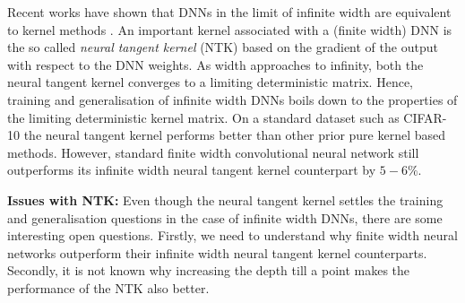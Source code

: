 \documentclass{article}
\begin{document}

Recent works have shown that DNNs in the limit of infinite width are equivalent to kernel methods \cite{ntk,fcgp,convgp,arora2019exact,cao2019generalization}. An important kernel associated with a (finite width) DNN is the so called \emph{neural tangent kernel} (NTK) based on the gradient of the output with respect to the DNN weights. As width approaches to infinity, both the neural tangent kernel converges to a limiting deterministic matrix. Hence, training and generalisation of infinite width DNNs boils down to the properties of the limiting deterministic kernel matrix. On a standard dataset such as CIFAR-10 the neural tangent kernel performs better than other prior pure kernel based methods. However, standard finite width convolutional neural network still outperforms its infinite width neural tangent kernel counterpart by $5-6\%$.

\textbf{Issues with NTK:} Even though the neural tangent kernel settles the training and generalisation questions in the case of infinite width DNNs, there are some interesting open questions. Firstly, we need to understand why  finite width neural networks outperform their infinite width neural tangent kernel counterparts. Secondly, it is not known why increasing the depth till a point makes the performance of the NTK also better.  %
\end{document}
